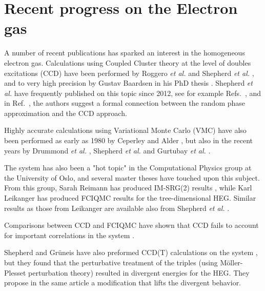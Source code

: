 \FloatBarrier

\section{Recent progress on the Electron gas}

A number of recent publications has sparked an interest in the
homogeneous electron gas. Calculations using Coupled Cluster theory at the level of doubles excitations (CCD)  
have been performed by
Roggero {\em et al.} \cite{Roggero2013} and Shepherd {\em et al.} 
\cite{Shepherd2012}, and to very high precision by Gustav Baardsen
in his PhD thesis \cite{Baardsen2014}. Shepherd {\em et al.} have
frequently published on this topic since 2012, see for example 
Refs.~\cite{Shepherd2012,Shepherd2012a, Shepherd2013, Shepherd2013c, Shepherd2014}, and in 
Ref.~\cite{Shepherd2014}, the authors suggest
a formal connection between the random phase approximation and the 
CCD approach.

Highly accurate calculations using Variational Monte Carlo (VMC) have
also been performed as early as 1980 by Ceperley and Alder
\cite{Ceperley1980}, but also in the recent years 
by Drummond {\em et al.} \cite{Drummond2006}, Shepherd {\em et al.} \cite{Shepherd2012} and
Gurtubay {\em et al.} \cite{Gurtubay2010}.

The system has also been a "hot topic" in the Computational Physics
group at the University of Oslo, and several master theses have touched
upon this subject. From this group, Sarah Reimann has produced IM-SRG(2)
results \cite{Reimann2013}, while Karl Leikanger has produced FCIQMC
\cite{Leikanger2013} results for the tree-dimensional HEG. Similar results as those from
Leikanger are available also from Shepherd {\em et al.} \cite{Shepherd2012}.

Comparisons between CCD and FCIQMC have shown that CCD fails to
account for important correlations in the system \cite{Baardsen2014}.

Shepherd and Grüneis have also preformed CCD(T) calculations on the
system \cite{Shepherd2013}, but they found that the perturbative
treatment of the triples (using Möller-Plesset perturbation theory) resulted in
divergent energies for the HEG. They propose in the same article a
modification that lifts the divergent behavior.

